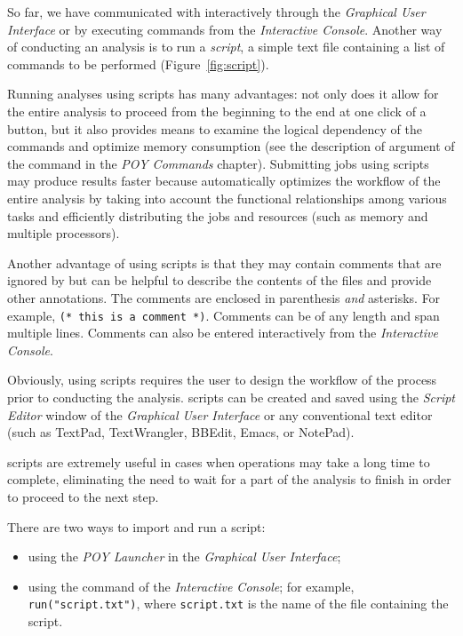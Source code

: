 {So far, we have communicated with \poy interactively through the \emph{Graphical User Interface} or by executing 
commands from the \emph{Interactive Console}. Another way of conducting an analysis is to run a \emph{script}, a 
simple text file containing a list of commands to be performed (Figure~\ref{fig:script}). 

Running analyses using scripts has many advantages: not only does it allow for the entire analysis to proceed from 
the beginning to the end at one click of a button, but it also provides means to examine the logical dependency of the 
commands and optimize memory consumption (see the description of  argument of the 
command  in the \emph{POY Commands} chapter). Submitting jobs using scripts may produce 
results faster because \poy automatically optimizes the workflow of the entire analysis by taking into account the
 functional relationships among various tasks and efficiently distributing the jobs and resources (such as memory 
 and multiple processors).

Another advantage of using scripts is that they may contain comments that are ignored by \poy but can be helpful 
to describe the contents of the files and provide other annotations. The comments are enclosed in parenthesis 
\emph{and} asterisks. For example, \texttt{(* this is a comment *)}. Comments can be of any length and span multiple 
lines. Comments can also be entered interactively from the \emph{Interactive Console}.

Obviously, using scripts requires the user to design the workflow of the process prior to conducting the analysis. 
\poy scripts can be created and saved using the \emph{Script Editor} window of the \poy \emph{Graphical User Interface} 
or any conventional text editor (such as TextPad, TextWrangler, BBEdit, Emacs, or NotePad).

\poy scripts are extremely useful in cases when operations may take a long time to complete, eliminating the need to wait 
for a part of the analysis to finish in order to proceed to the next step.

There are two ways to import and run a script:
\begin{itemize}
    \item using the \emph{POY Launcher} in the \emph{Graphical User Interface};
    \item using the command  of the \emph{Interactive Console}; for example, \texttt{run("script.txt")}, 
    where \texttt{script.txt} is the name of the file containing the script.
\end{itemize}

}

